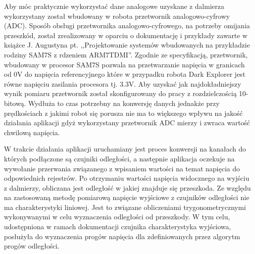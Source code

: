 Aby móc praktycznie wykorzystać dane analogowe uzyskane z dalmierza wykorzystany
został wbudowany w robota przetwornik analogowo-cyfrowy (ADC). Sposób obsługi
przetwornika analogowo-cyfrowego, na potrzeby omijania przeszkód, został
zrealizowany w oparciu o dokumentację i przykłady zawarte w książce J. Augustyna
pt. ,,Projektowanie systemów wbudowanych na przykładzie rodziny SAM7S z rdzeniem
ARM7TDMI''. Zgodnie ze specyfikacją, przetwornik, wbudowany w procesor SAM7S
pozwala na przetwarzanie napięcia w granicach od 0V do napięcia referencyjnego
które w przypadku robota Dark Explorer jest równe napięciu zasilania procesora
tj. 3.3V. Aby uzyskać jak najdokładniejszy wynik pomiaru
przetwornik został skonfigurowany do pracy z rozdzielczością 10-bitową. Wydłuża to czas potrzebny na
konwersję danych jednakże przy prędkościach z jakimi robot się porusza nie ma to
większego wpływu na jakość działania aplikacji gdyż wykorzystany przetwornik
ADC mierzy i zwraca wartość chwilową napięcia\cite{JAugustyn}.

W trakcie działania aplikacji uruchamiany jest proces konwersji na kanałach do
których podłączone są czujniki odległości, a następnie aplikacja oczekuje na
wywołanie przerwania związanego z wpisaniem wartości na temat napięcia do
odpowiednich rejestrów. Po otrzymaniu wartości napięcia widocznego na wyjściu z
dalmierzy, obliczana jest odległość w jakiej znajduje się przeszkoda. Ze względu
na zastosowaną metodę pomiarową napięcie wyjściowe z czujników odległości nie ma
charakterystyki liniowej. Jest to związane obliczeniami trygonometrycznymi
wykonywanymi w celu wyznaczenia odległości od przeszkody. 
W tym celu,
udostępniona w ramach dokumentacji czujnika\cite{GP2D12DataSheet} charakterystyka
wyjściowa, posłużyła do wyznaczenia progów napięcia dla zdefiniowanych przez
algorytm progów odległości.

